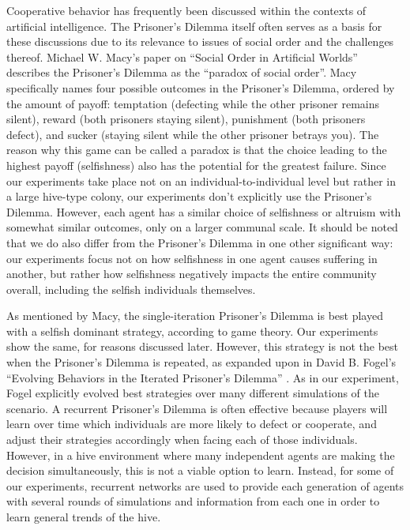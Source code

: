 \documentclass[11pt]{article}
\begin{document}
		Cooperative behavior has frequently been discussed within the contexts of artificial intelligence. The Prisoner's Dilemma itself often serves as a basis for these discussions due to its relevance to issues of social order and the challenges thereof. Michael W. Macy's paper on ``Social Order in Artificial Worlds'' describes the Prisoner's Dilemma as the ``paradox of social order''. \cite{macy} Macy specifically names four possible outcomes in the Prisoner's Dilemma, ordered by the amount of payoff: temptation (defecting while the other prisoner remains silent), reward (both prisoners staying silent), punishment (both prisoners defect), and sucker (staying silent while the other prisoner betrays you). The reason why this game can be called a paradox is that the choice leading to the highest payoff (selfishness) also has the potential for the greatest failure. Since our experiments take place not on an individual-to-individual level but rather in a large hive-type colony, our experiments don't explicitly use the Prisoner's Dilemma. However, each agent has a similar choice of selfishness or altruism with somewhat similar outcomes, only on a larger communal scale. It should be noted that we do also differ from the Prisoner's Dilemma in one other significant way: our experiments focus not on how selfishness in one agent causes suffering in another, but rather how selfishness negatively impacts the entire community overall, including the selfish individuals themselves.

		As mentioned by Macy, the single-iteration Prisoner's Dilemma is best played with a selfish dominant strategy, according to game theory. Our experiments show the same, for reasons discussed later. However, this strategy is not the best when the Prisoner's Dilemma is repeated, as expanded upon in David B. Fogel's ``Evolving Behaviors in the Iterated Prisoner's Dilemma'' \cite{fogel}. As in our experiment, Fogel explicitly evolved best strategies over many different simulations of the scenario. A recurrent Prisoner's Dilemma is often effective because players will learn over time which individuals are more likely to defect or cooperate, and adjust their strategies accordingly when facing each of those individuals. However, in a hive environment where many independent agents are making the decision simultaneously, this is not a viable option to learn. Instead, for some of our experiments, recurrent networks are used to provide each generation of agents with several rounds of simulations and information from each one in order to learn general trends of the hive.
\end{document}
